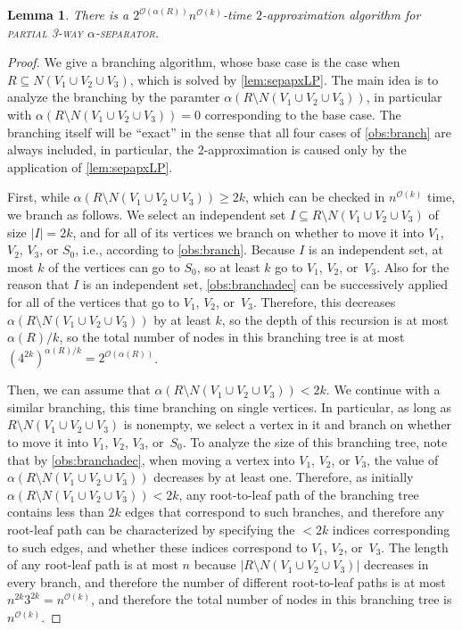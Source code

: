 \documentclass[11pt]{article}
\newtheorem{lemma}{Lemma}[section]
\theoremstyle{definition}
\newcommand{\OO}{\mathcal{O}}
\begin{document}
\begin{lemma}
\label{lem:sepfind_boundalpha}
There is a $2^{\OO(\alpha(R))} n^{\OO(k)}$-time $2$-approximation algorithm for \textsc{partial 3-way $\alpha$-separator}.
\end{lemma}
\begin{proof}
We give a branching algorithm, whose base case is the case when $R \subseteq N(V_1 \cup V_2 \cup V_3)$, which is solved by \cref{lem:sepapxLP}.
The main idea is to analyze the branching by the paramter $\alpha(R \setminus N(V_1 \cup V_2 \cup V_3))$, in particular with $\alpha(R \setminus N(V_1 \cup V_2 \cup V_3)) = 0$ corresponding to the base case.
The branching itself will be ``exact'' in the sense that all four cases of \cref{obs:branch} are always included, in particular, the 2-approximation is caused only by the application of \cref{lem:sepapxLP}.


First, while $\alpha(R \setminus N(V_1 \cup V_2 \cup V_3)) \ge 2k$, which can be checked in $n^{\OO(k)}$ time, we branch as follows.
We select an independent set $I \subseteq R \setminus N(V_1 \cup V_2 \cup V_3)$ of size $|I| = 2k$, and for all of its vertices we branch on whether to move it into  $V_1$, $V_2$, $V_3$, or $S_0$, i.e., according to \cref{obs:branch}.
Because $I$ is an independent set, at most $k$ of the vertices can go to $S_0$, so at least $k$ go to $V_1$, $V_2$, or~$V_3$.
Also for the reason that $I$ is an independent set, \cref{obs:branchadec} can be successively applied for all of the vertices that go to $V_1$, $V_2$, or~$V_3$.
Therefore, this decreases $\alpha(R \setminus N(V_1 \cup V_2 \cup V_3))$ by at least $k$, so the depth of this recursion is at most $\alpha(R)/k$, so the total number of nodes in this branching tree is at most $(4^{2k})^{\alpha(R)/k} = 2^{\OO(\alpha(R))}$.


Then, we can assume that $\alpha(R \setminus N(V_1 \cup V_2 \cup V_3)) < 2k$.
We continue with a similar branching, this time branching on single vertices.
In particular, as long as $R \setminus N(V_1 \cup V_2 \cup V_3)$ is nonempty, we select a vertex in it and branch on whether to move it into $V_1$, $V_2$, $V_3$, or~$S_0$.
To analyze the size of this branching tree, note that by \cref{obs:branchadec}, when moving a vertex into $V_1$, $V_2$, or $V_3$, the value of $\alpha(R \setminus N(V_1 \cup V_2 \cup V_3))$ decreases by at least one.
Therefore, as initially $\alpha(R \setminus N(V_1 \cup V_2 \cup V_3)) < 2k$, any root-to-leaf path of the branching tree contains less than $2k$ edges that correspond to such branches, and therefore any root-leaf path can be characterized by specifying the $<2k$ indices corresponding to such edges, and whether these indices correspond to $V_1$, $V_2$, or~$V_3$.
The length of any root-leaf path is at most $n$ because $|R \setminus N(V_1 \cup V_2 \cup V_3)|$ decreases in every branch, and therefore the number of different root-to-leaf paths is at most $n^{2k} 3^{2k} = n^{\OO(k)}$, and therefore the total number of nodes in this branching tree is $n^{\OO(k)}$.


\end{proof}
\end{document}
